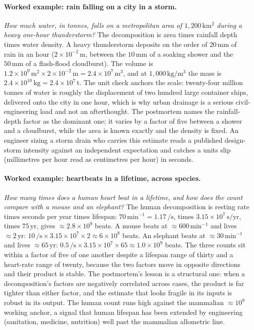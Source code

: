 \paragraph{Worked example: rain falling on a city in a storm.}
\emph{How much water, in tonnes, falls on a metropolitan area of
$1{,}200 \,\si{\kilo\meter\squared}$ during a heavy one-hour
thunderstorm?} The decomposition is area times rainfall depth times
water density. A heavy thunderstorm deposits on the order of $20 \,
\si{\milli\meter}$ of rain in an hour ($2 \times 10^{-2} \,\si{\meter}$,
between the $10 \,\si{\milli\meter}$ of a soaking shower and the $50 \,
\si{\milli\meter}$ of a flash-flood cloudburst). The volume is
$1.2 \times 10^{9} \,\si{\meter\squared} \times 2 \times 10^{-2}
\,\si{\meter} = 2.4 \times 10^{7} \,\si{\meter\cubed}$, and at
$1{,}000 \,\si{\kilo\gram\per\meter\cubed}$ the mass is
$2.4 \times 10^{10} \,\si{\kilo\gram} = 2.4 \times 10^{7}
\,\si{\tonne}$. The unit check anchors the scale: twenty-four million
tonnes of water is roughly the displacement of two hundred large
container ships, delivered onto the city in one hour, which is why
urban drainage is a serious civil-engineering load and not an
afterthought. The postmortem names the rainfall-depth factor as the
dominant one; it varies by a factor of five between a shower and a
cloudburst, while the area is known exactly and the density is fixed.
An engineer sizing a storm drain who carries this estimate reads a
published design-storm intensity against an independent expectation
and catches a units slip (millimetres per hour read as centimetres per
hour) in seconds.

\paragraph{Worked example: heartbeats in a lifetime, across species.}
\emph{How many times does a human heart beat in a lifetime, and how
does the count compare with a mouse and an elephant?} The human
decomposition is resting rate times seconds per year times lifespan:
$70 \,\text{min}^{-1} = 1.17 \,\si{\per\second}$, times $3.15 \times
10^{7} \,\si{\second}/\text{yr}$, times $75 \,\text{yr}$, gives
$\approx 2.8 \times 10^{9}$ beats. A mouse beats at $\approx 600 \,
\text{min}^{-1}$ and lives $\approx 2 \,\text{yr}$: $10 \,\si{\per
\second} \times 3.15 \times 10^{7} \times 2 \approx 6 \times 10^{8}$
beats. An elephant beats at $\approx 30 \,\text{min}^{-1}$ and lives
$\approx 65 \,\text{yr}$: $0.5 \,\si{\per\second} \times 3.15 \times
10^{7} \times 65 \approx 1.0 \times 10^{9}$ beats. The three counts
sit within a factor of five of one another despite a lifespan range of
thirty and a heart-rate range of twenty, because the two factors move
in opposite directions and their product is stable. The postmortem's
lesson is a structural one: when a decomposition's factors are
negatively correlated across cases, the product is far tighter than
either factor, and the estimate that looks fragile in its inputs is
robust in its output. The human count runs high against the mammalian
$\approx 10^{9}$ working anchor, a signal that human lifespan has been
extended by engineering (sanitation, medicine, nutrition) well past
the mammalian allometric line.

